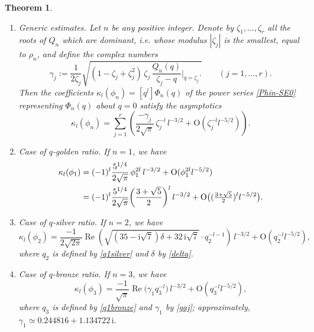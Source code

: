 \documentclass[11pt,reqno]{amsart}
\theoremstyle{plain}
\newtheorem{theoreme}[lemme]{Theorem}
\theoremstyle{definition}
\numberwithin{figure}{section}
\numberwithin{table}{section}
\numberwithin{equation}{section}
\newcommand\de{\delta}
\newcommand\ga{\gamma}
\newcommand\ka{\kappa}
\newcommand\bigo{\mathrm{O}}
\newcommand\ip{\ensuremath{\mathrm{i}}}
\DeclareMathOperator{\re}{Re}
\let\fr=\frac
\begin{document}
\begin{theoreme} \label{thm-asymp}
\begin{enumerate}
\item \emph{Generic estimates.} Let $n$ be any positive integer. Denote by $\zeta_1,\ldots,\zeta_r$ all the roots of $Q_n$ which are dominant, i.e. whose modulus $|\zeta_j|$ is the smallest, equal to $\rho_n$,  and define the complex numbers
\begin{equation}\label{gaj}
\ga_j:=\fr{1}{2\zeta_j}\sqrt{(1-\zeta_j+\zeta_j^2)\,\zeta_j\, \fr{Q_n(q)}{\zeta_j-q}\biggl|_{q=\zeta_j}\biggr.}\qquad (j=1,\ldots,r).
\end{equation}
Then the coefficients $\ka_l(\phi_n)=[q^l]\Phi_n(q)$ of the power series \eqref{Phin-SE0} representing $\Phi_n(q)$ about $q=0$ satisfy the asymptotics
\begin{equation}\label{asymp-gen}
\ka_l(\phi_n)=\sum_{j=1}^r \left(\fr{-\ga_j}{2\sqrt{\pi}}\,\zeta_j^{-l}\,l^{-3/2}+\bigo(\zeta_j^{-l}l^{-5/2})\right).
\end{equation}
\item \emph{Case of $q$-golden ratio.} If $n=1$, we have
\begin{align}
\label{asymp-gold}
\ka_l(\phi_1)
&=(-1)^l \fr{5^{1/4}}{2\sqrt{\pi}}\, \phi_1^{2l}\, l^{-3/2}+\bigo(\phi_1^{2l}l^{-5/2})\notag \\
&=(-1)^l\fr{5^{1/4}}{2\sqrt{\pi}}\biggl(\fr{3+\sqrt{5}}{2}\biggr)^l \,l^{-3/2}+\bigo\bigl((\tfrac{3+\sqrt{5}}{2})^l l^{-5/2}\bigr).
\end{align}\item \emph{Case of $q$-silver ratio.} If $n=2$, we have
\begin{equation}
\label{asymp-silver}
\ka_l(\phi_2)
=\fr{-1}{2\sqrt{2\pi}}\re\left(\sqrt{(35-\ip\sqrt{7})\de+32\,\ip\sqrt{7}}\cdot q_2^{-l-1}\right)\, l^{-3/2}+\bigo(q_2^{-l}l^{-5/2}),
\end{equation}
where $q_2$ is defined by \eqref{q1silver} and $\de$ by \eqref{delta}.
\item \emph{Case of $q$-bronze ratio.} If $n=3$, we have
\begin{equation}
\label{asymp-bronze}
\ka_l(\phi_3)
=\fr{-1}{\sqrt{\pi}}\re\bigl(\ga_1 q_3^{-l}\bigr)\, l^{-3/2}+\bigo(q_3^{-l}l^{-5/2}),
\end{equation}
where $q_3$ is defined by \eqref{q1bronze} and $\ga_1$ by \eqref{gaj}; approximately, $\ga_1\simeq 0.244816 + 1.134722\,\ip$.
\end{enumerate}
\end{theoreme}
\end{document}
